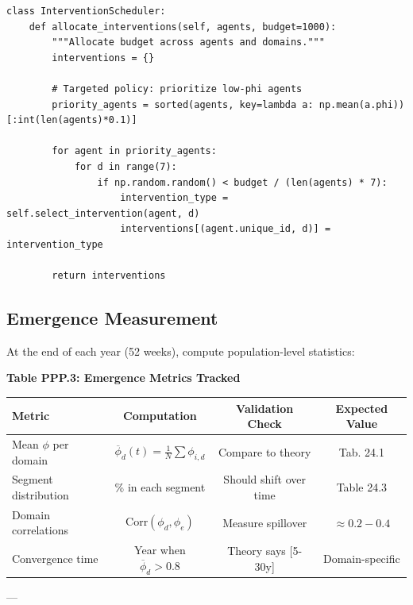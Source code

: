 \begin{verbatim}
class InterventionScheduler:
    def allocate_interventions(self, agents, budget=1000):
        """Allocate budget across agents and domains."""
        interventions = {}

        # Targeted policy: prioritize low-phi agents
        priority_agents = sorted(agents, key=lambda a: np.mean(a.phi))[:int(len(agents)*0.1)]

        for agent in priority_agents:
            for d in range(7):
                if np.random.random() < budget / (len(agents) * 7):
                    intervention_type = self.select_intervention(agent, d)
                    interventions[(agent.unique_id, d)] = intervention_type

        return interventions
\end{verbatim}

\subsection{Emergence Measurement}

At the end of each year (52 weeks), compute population-level statistics:

\textbf{Table PPP.3: Emergence Metrics Tracked}

\begin{center}
\small
\begin{tabular}{@{}lccc@{}}
\toprule
\textbf{Metric} & \textbf{Computation} & \textbf{Validation Check} & \textbf{Expected Value} \\
\midrule
Mean $\phi$ per domain & $\overline{\phi}_d(t) = \frac{1}{N}\sum \phi_{i,d}$ & Compare to theory & Tab. 24.1 \\
Segment distribution & \% in each segment & Should shift over time & Table 24.3 \\
Domain correlations & $\text{Corr}(\phi_d, \phi_e)$ & Measure spillover & $\approx 0.2-0.4$ \\
Convergence time & Year when $\overline{\phi}_d > 0.8$ & Theory says [5-30y] & Domain-specific \\
\midrule
\end{tabular}
\end{center}

---


